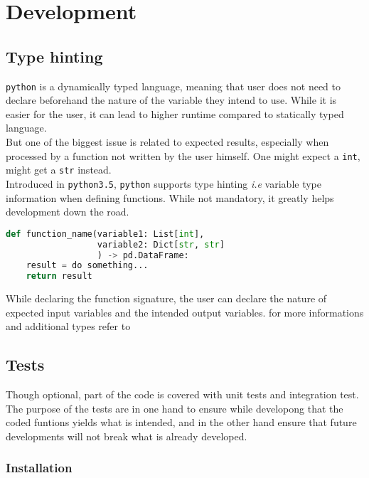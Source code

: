 \chapter{Development}

\section{Type hinting} %
\label{sec:type_hinting}

\lstinline{python} is a dynamically typed language, meaning that user does not need to declare beforehand the nature of the variable they intend to use. While it is easier for the user, it can lead to higher runtime compared to statically typed language.\\
But one of the biggest issue is related to expected results, especially when processed by a function not written by the user himself. One might expect a \lstinline{int}, might get a \lstinline{str} instead.\\

Introduced in \lstinline{python3.5}, \lstinline{python} supports type hinting \textit{i.e} variable type information when defining functions. While not mandatory, it greatly helps development down the road.

\begin{lstlisting}[language=python]
def function_name(variable1: List[int],
                  variable2: Dict[str, str]
                  ) -> pd.DataFrame:
    result = do something...
    return result
\end{lstlisting}

While declaring the function signature, the user can declare the nature of expected input variables and the intended output variables.
for more informations and additional types refer to \cite{python_software_foundation_typing_2019}

\section{Tests} %
\label{sec:tests}

Though optional, part of the code is covered with unit tests and integration test.\\
The purpose of the tests are in one hand to ensure while developong that the coded funtions yields what is intended, and in the other hand ensure that future developments will not break what is already developed.

\subsection{Installation} %
\label{sec:installation}

